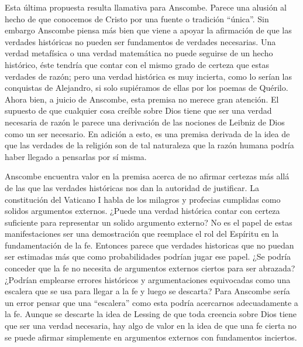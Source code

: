 Esta última propuesta resulta llamativa para Anscombe. Parece una alusión al
hecho de que conocemos de Cristo por una fuente o tradición \enquote{única}. Sin
embargo Anscombe piensa más bien que viene a apoyar la afirmación de que las
verdades históricas no pueden ser fundamentos de verdades necesarias. Una verdad
metafísica o una verdad matemática no puede seguirse de un hecho histórico, éste
tendría que contar con el mismo grado de certeza que estas verdades de razón;
pero una verdad histórica es muy incierta, como lo serían las conquistas de
Alejandro, si solo supiéramos de ellas por los poemas de Quérilo. Ahora bien, a
juicio de Anscombe, esta premisa no merece gran atención. El supuesto de que
cualquier cosa creíble sobre Dios tiene que ser una verdad necesaria de razón le
parece una derivación de las nociones de Leibniz de Dios como un ser necesario.
En adición a esto, es una premisa derivada de la idea de que las verdades de la
religión son de tal naturaleza que la razón humana podría haber llegado a
pensarlas por sí misma.

Anscombe encuentra valor en la premisa acerca de no afirmar certezas más allá de
las que las verdades históricas nos dan la autoridad de justificar. La
constitución del Vaticano I habla de los milagros y profecias cumplidas como
solidos argumentos externos. ¿Puede una verdad histórica contar con certeza
suficiente para representar un solido argumento externo? No es el papel de estas
manifestaciones ser una demostración que reemplace el rol del Espíritu en la
fundamentación de la fe. Entonces parece que verdades historicas que no puedan
ser estimadas más que como probabilidades podrían jugar ese papel. ¿Se podría
conceder que la fe no necesita de argumentos externos ciertos para ser abrazada?
¿Podrían emplearse errores históricos y argumentaciones equivocadas como una
escalera que se usa para llegar a la fe y luego se descarta? Para Anscombe sería
un error pensar que una \enquote{escalera} como esta podría acercarnos
adecuadamente a la fe. Aunque se descarte la idea de Lessing de que toda
creencia sobre Dios tiene que ser una verdad necesaria, hay algo de valor en la
idea de que una fe cierta no se puede afirmar simplemente en argumentos externos
con fundamentos inciertos.


